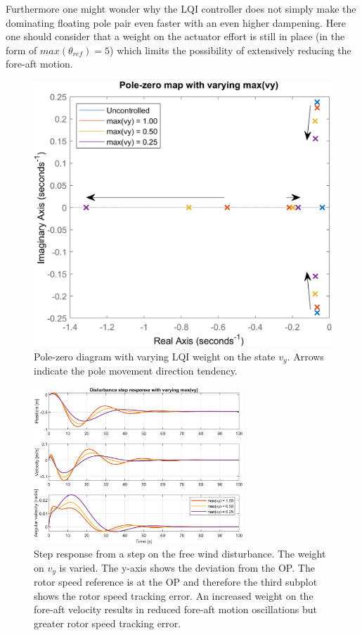 Furthermore one might wonder why the LQI controller does not simply make the dominating floating pole pair even faster with an even higher dampening. Here one should consider that a weight on the actuator effort is still in place (in the form of $ max(\theta_{ref}) = 5 $) which limits the possibility of extensively reducing the fore-aft motion.
\begin{figure}[ht]
	\centering
	\includegraphics[width=.55\textwidth]{Graphics/LQI pole zero/02_pzmap_vy}
	\caption{Pole-zero diagram with varying LQI weight on the state $ v_y $. Arrows indicate the pole movement direction tendency.}
	\label{fig:pzmap_vy}
\end{figure}
\begin{figure}[ht]
	\centering
	\includegraphics[width=0.7\textwidth]{Graphics/LQI pole zero/102_step_vy.png}
	\caption{Step response from a step on the free wind disturbance. The weight on $ v_y $ is varied. The y-axis shows the deviation from the OP. The rotor speed reference is at the OP and therefore the third subplot shows the rotor speed tracking error. An increased weight on the fore-aft velocity results in reduced fore-aft motion oscillations but greater rotor speed tracking error.}
	\label{fig:step_vy}
\end{figure}

